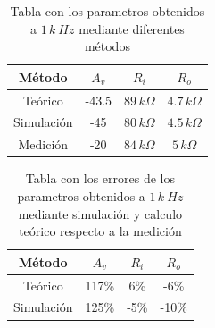 \documentclass[10pt,spanish,a4paper,notitlepage]{article}
\begin{document}
\begin{table}[H]
    \centering
    \begin{tabular}{|c|c|c|c|} %
    \hline
    Método & $A_v$ & $R_i$  & $R_o$ \\ \hline
    Teórico & -43.5 & $89\,\unit{k\Omega}$  & $4.7\,\unit{k\Omega}$   \\ \hline
    Simulación & -45 & $80\,\unit{k\Omega}$  & $4.5\,\unit{k\Omega}$   \\ \hline
    Medición & -20 & $84\,\unit{k\Omega}$  & $5\,\unit{k\Omega}$   \\ \hline
    \end{tabular}
    \caption{Tabla con los parametros obtenidos a $1\,\unit{k\ Hz}$ mediante diferentes métodos}
    \label{table:param_comp}
    \end{table}


\begin{table}[H]
    \centering
    \begin{tabular}{|c|c|c|c|} %
    \hline
    Método & $A_v$ & $R_i$  & $R_o$ \\ \hline
    Teórico & 117\% & 6\%  & -6\%  \\ \hline
    Simulación & 125\% & -5\%  & -10\%  \\ \hline
   
    \end{tabular}
    \caption{Tabla con los errores de los parametros obtenidos a $1\,\unit{k\ Hz}$ mediante simulación y calculo teórico respecto a la medición}
    \label{table:param_comperror}
    \end{table}
\end{document}
